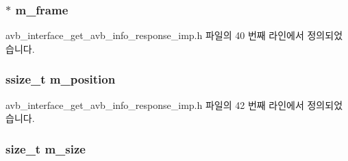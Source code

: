 \subsubsection[{\texorpdfstring{m\+\_\+frame}{m_frame}}]{$\ast$ m\+\_\+frame\hspace{0.3cm}{\ttfamily [private]}}\hypertarget{classavdecc__lib_1_1avb__interface__get__avb__info__response__imp_a50417969cf438e7c8d698726bbbe2ff9}{}\label{classavdecc__lib_1_1avb__interface__get__avb__info__response__imp_a50417969cf438e7c8d698726bbbe2ff9}


avb\+\_\+interface\+\_\+get\+\_\+avb\+\_\+info\+\_\+response\+\_\+imp.\+h 파일의 40 번째 라인에서 정의되었습니다.

\subsubsection[{\texorpdfstring{m\+\_\+position}{m_position}}]{\setlength{\rightskip}{0pt plus 5cm}ssize\+\_\+t m\+\_\+position\hspace{0.3cm}{\ttfamily [private]}}\hypertarget{classavdecc__lib_1_1avb__interface__get__avb__info__response__imp_af5e691c4a8a0feb07f48440b321206cd}{}\label{classavdecc__lib_1_1avb__interface__get__avb__info__response__imp_af5e691c4a8a0feb07f48440b321206cd}


avb\+\_\+interface\+\_\+get\+\_\+avb\+\_\+info\+\_\+response\+\_\+imp.\+h 파일의 42 번째 라인에서 정의되었습니다.

\subsubsection[{\texorpdfstring{m\+\_\+size}{m_size}}]{\setlength{\rightskip}{0pt plus 5cm}size\+\_\+t m\+\_\+size\hspace{0.3cm}{\ttfamily [private]}}\hypertarget{classavdecc__lib_1_1avb__interface__get__avb__info__response__imp_a0dc3c363255f193681c77b4d2a82e995}{}\label{classavdecc__lib_1_1avb__interface__get__avb__info__response__imp_a0dc3c363255f193681c77b4d2a82e995}


